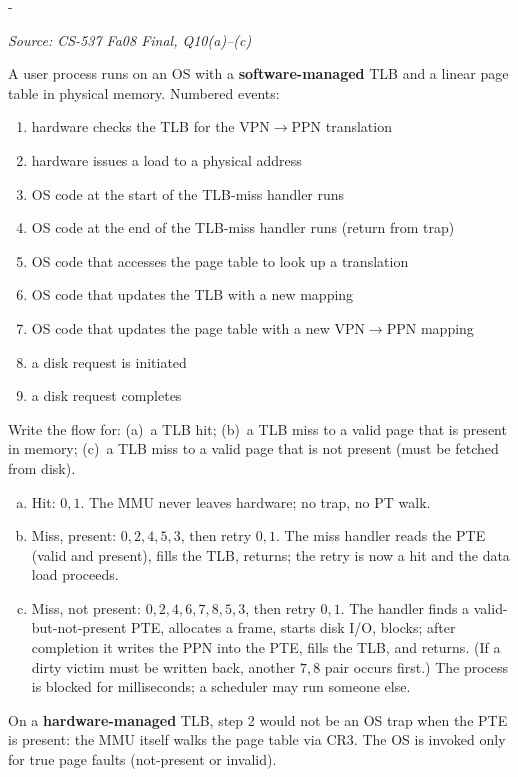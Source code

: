 \documentclass[11pt,a4paper]{article}
\makeatletter
\newcommand{\keepspace}[1]{\par\penalty-100\begingroup
  \setlength{\dimen@}{#1}\dimen@ii\pagegoal\advance\dimen@ii-\pagetotal
  \ifdim\dimen@>\dimen@ii\ifdim\dimen@ii>\z@\vfil\fi\break\fi\endgroup}
\newcounter{qn}[section]
\newenvironment{Qn}[4]{%
  \refstepcounter{qn}\keepspace{7\baselineskip}%
  \begin{tcolorbox}[qboxstyle, title={Q\thesection.\theqn\ \ [#1 \textbar\ #2]\ \ #4}]%
  {\footnotesize\color{g3}\textit{Source: #3}}\par\smallskip%
}{%
  \end{tcolorbox}%
}
\newenvironment{Sol}{%
  \begin{tcolorbox}[sboxstyle, title={Solution}]%
}{%
  \end{tcolorbox}\vspace{0.35em}%
}
\makeatother
\begin{document}
\begin{Qn}{Medium}{Lect 13}{CS-537 Fa08 Final, Q10(a)--(c)}{Control flow: TLB hit, miss-present, miss-not-present}
A user process runs on an OS with a \textbf{software-managed} TLB and a
linear page table in physical memory. Numbered events:
\begin{enumerate}[0.]
\item hardware checks the TLB for the VPN$\to$PPN translation
\item hardware issues a load to a physical address
\item OS code at the start of the TLB-miss handler runs
\item OS code at the end of the TLB-miss handler runs (return from trap)
\item OS code that accesses the page table to look up a translation
\item OS code that updates the TLB with a new mapping
\item OS code that updates the page table with a new VPN$\to$PPN mapping
\item a disk request is initiated
\item a disk request completes
\end{enumerate}
Write the flow for: (a)~a TLB hit; (b)~a TLB miss to a valid page that
is present in memory; (c)~a TLB miss to a valid page that is not present
(must be fetched from disk).
\end{Qn}
\begin{Sol}
\begin{enumerate}[(a)]
\item Hit: $0,1$. The MMU never leaves hardware; no trap, no PT walk.
\item Miss, present: $0,2,4,5,3$, then retry $0,1$.
      The miss handler reads the PTE (valid and present), fills the TLB,
      returns; the retry is now a hit and the data load proceeds.
\item Miss, not present: $0,2,4,6,7,8,5,3$, then retry $0,1$.
      The handler finds a valid-but-not-present PTE, allocates a frame,
      starts disk I/O, blocks; after completion it writes the PPN into
      the PTE, fills the TLB, and returns. (If a dirty victim must be
      written back, another $7,8$ pair occurs first.) The process is
      blocked for milliseconds; a scheduler may run someone else.
\end{enumerate}
On a \textbf{hardware-managed} TLB, step 2 would not be an OS trap when
the PTE is present: the MMU itself walks the page table via CR3. The OS
is invoked only for true page faults (not-present or invalid).
\end{Sol}
\end{document}
